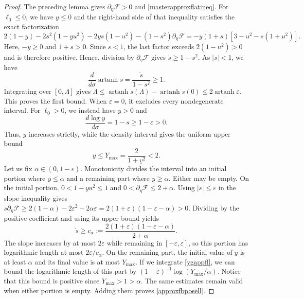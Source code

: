 \documentclass[amsmath,amsfonts,amssymb,aps,pra,superscriptaddress,10pt]{revtex4-2}
\numberwithin{equation}{section}
\theoremstyle{plain}
\theoremstyle{definition}
\theoremstyle{remark}
\theoremstyle{definition}
\newcommand{\ellzero}{\ell_0}
\begin{document}
\begin{proof}
The preceding lemma gives $\partial_\eta\mathcal{F}>0$ and \eqref{masterapproxflatineq}. For $\ellzero\leq 0$, we have $y\leq 0$ and the right-hand side of that inequality satisfies the exact factorization
\begin{equation}\label{sharpnegellfactor}
2(1-y)-2s^2(1-yu^2)-2ys(1-u^2)-(1-s^2)\partial_\eta\mathcal{F}
=-y(1+s)[3-u^2-s(1+u^2)].
\end{equation}
Here, $-y\geq 0$ and $1+s>0$. Since $s<1$, the last factor exceeds $2(1-u^2)>0$ and is therefore positive. Hence, division by $\partial_\eta\mathcal{F}$ gives $\dot{s}\geq 1-s^2$. As $|s|<1$, we have
\begin{equation}
\frac{d}{d\sigma}\operatorname{artanh}{s}=\frac{\dot{s}}{1-s^2}\geq 1.
\end{equation}
Integrating over $[0,\Lambda]$ gives $\Lambda\leq\operatorname{artanh}{s(\Lambda)}-\operatorname{artanh}{s(0)}
\leq 2\operatorname{artanh}{\varepsilon}$. This proves the first bound. When $\varepsilon=0$, it excludes every nondegenerate interval. For $\ellzero>0$, we instead have $y>0$ and
\begin{equation}\label{ygappfl}
\frac{d\log{y}}{d\sigma}=1-s\geq 1-\varepsilon>0.
\end{equation}
Thus, $y$ increases strictly, while the density interval gives the uniform upper bound
\begin{equation}
y\leq Y_{\max}=\frac{2}{1+\underline{v}^2}<2.
\end{equation}
Let us fix $\alpha\in(0,1-\varepsilon)$. Monotonicity divides the interval into an initial portion where $y\leq\alpha$ and a remaining part where $y\geq\alpha$. Either may be empty. On the initial portion, $0<1-yu^2\leq 1$ and $0<\partial_\eta\mathcal{F}\leq 2+\alpha$. Using $|s|\leq\varepsilon$ in the slope inequality gives $
\dot{s}\partial_\eta\mathcal{F}\geq 2(1-\alpha)-2\varepsilon^2-2\alpha\varepsilon=2(1+\varepsilon)(1-\varepsilon-\alpha)>0$. Dividing by the positive coefficient and using its upper bound yields
\begin{equation}
\dot{s}\geqslant c_\alpha:=\frac{2(1+\varepsilon)(1-\varepsilon-\alpha)}{2+\alpha}.
\end{equation}
The slope increases by at most $2\varepsilon$ while remaining in $[-\varepsilon,\varepsilon]$, so this portion has logarithmic length at most $2\varepsilon/c_\alpha$. On the remaining part, the initial value of $y$ is at least $\alpha$ and its final value is at most $Y_{\max}$. If we integrate \eqref{ygappfl}, we can bound the logarithmic length of this part by $(1-\varepsilon)^{-1}\log{(Y_{\max}/\alpha)}$. Notice that this bound is positive since $Y_{\max}>1>\alpha$. The same estimates remain valid when either portion is empty. Adding them proves \eqref{approxfbposell}.
\end{proof}
\end{document}
